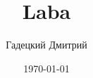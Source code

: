 \documentclass[a4paper,12pt]{article}
\title{Laba}
\author{Гадецкий Дмитрий}
\date{\today}
\begin{document}

\renewcommand{\baselinestretch}{1.3}





%
%
\end{document}
